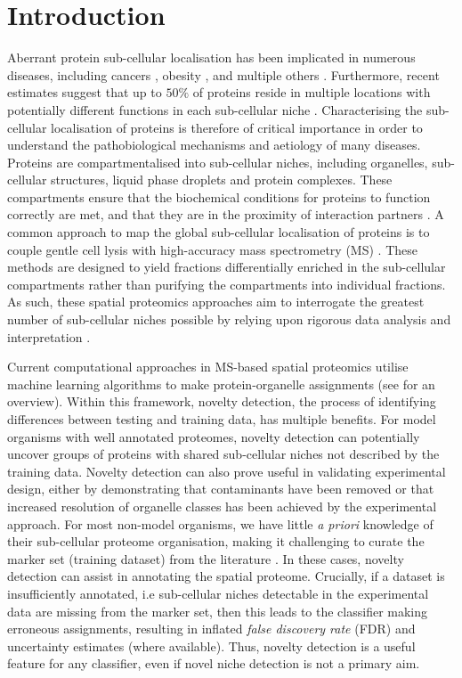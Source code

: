 \documentclass[12pt,english]{article}
\begin{document}
\section*{Introduction}
Aberrant protein sub-cellular localisation has been implicated in numerous diseases, including cancers \citep{Kau:2004}, obesity \citep{Siljee:2018}, and multiple others \citep{Laurila:2009}. Furthermore, recent estimates suggest that up to $50\%$ of proteins reside in multiple locations with potentially different functions in each sub-cellular niche \citep{hyper, Thul:2017}. Characterising the sub-cellular localisation of proteins is therefore of critical importance in order to understand the pathobiological mechanisms and aetiology of many diseases. Proteins are compartmentalised into sub-cellular niches, including organelles, sub-cellular structures, liquid phase droplets and protein complexes. These compartments ensure that the biochemical conditions for proteins to function correctly are met, and that they are in the proximity of interaction partners \citep{Gibson:2009}. A common approach to map the global sub-cellular localisation of proteins is to couple gentle cell lysis with high-accuracy mass spectrometry (MS) \citep{hyper, Mulvey:2017, DC:2018, Orre:2019}. These methods are designed to yield fractions differentially enriched in the sub-cellular compartments rather than purifying the compartments into individual fractions. As such, these spatial proteomics approaches aim to interrogate the greatest number of sub-cellular niches possible by relying upon rigorous data analysis and interpretation \citep{Gatto:2010, Gatto:2014b}.

Current computational approaches in MS-based spatial proteomics utilise machine learning algorithms to make protein-organelle assignments (see \cite{Gatto:2014b} for an overview). Within this framework, novelty detection, the process of identifying differences between testing and training data, has multiple benefits. For model organisms with well annotated proteomes, novelty detection can potentially uncover groups of proteins with shared sub-cellular niches not described by the training data. Novelty detection can also prove useful in validating experimental design, either by demonstrating that contaminants have been removed or that increased resolution of organelle classes has been achieved by the experimental approach. For most non-model organisms, we have little \textit{a priori} knowledge of their sub-cellular proteome organisation, making it challenging to curate the marker set (training dataset) from the literature \citep{Barylyuk::2020}. In these cases, novelty detection can assist in annotating the spatial proteome.  Crucially, if a dataset is insufficiently annotated, i.e sub-cellular niches detectable in the experimental data are missing from the marker set, then this leads to the classifier making erroneous assignments, resulting in inflated \textit{false discovery rate} (FDR) and uncertainty estimates (where available). Thus, novelty detection is a useful feature for any classifier, even if novel niche detection is not a primary aim.
\end{document}
